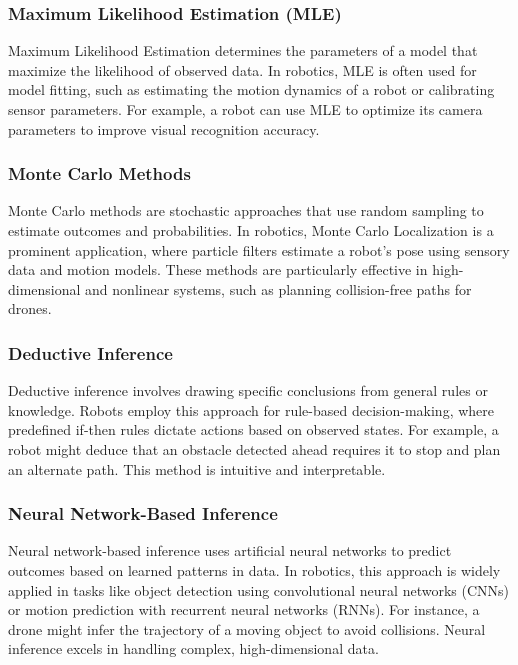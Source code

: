     \subsubsection{Maximum Likelihood Estimation (MLE)}
    Maximum Likelihood Estimation determines the parameters of a model that maximize the likelihood of observed data. In robotics, MLE is often used for model fitting, such as estimating the motion dynamics of a robot or calibrating sensor parameters. For example, a robot can use MLE to optimize its camera parameters to improve visual recognition accuracy. \cite{bishop-2006-pattern-recognition}
    
    \subsubsection{Monte Carlo Methods}
    Monte Carlo methods are stochastic approaches that use random sampling to estimate outcomes and probabilities. In robotics, Monte Carlo Localization is a prominent application, where particle filters estimate a robot’s pose using sensory data and motion models. These methods are particularly effective in high-dimensional and nonlinear systems, such as planning collision-free paths for drones. \cite{russell-2010-artificial-intelligence}
    
    \subsubsection{Deductive Inference}
    Deductive inference involves drawing specific conclusions from general rules or knowledge. Robots employ this approach for rule-based decision-making, where predefined if-then rules dictate actions based on observed states. For example, a robot might deduce that an obstacle detected ahead requires it to stop and plan an alternate path. This method is intuitive and interpretable. \cite{russell-2010-artificial-intelligence}
    
    \subsubsection{Neural Network-Based Inference}
    Neural network-based inference uses artificial neural networks to predict outcomes based on learned patterns in data. In robotics, this approach is widely applied in tasks like object detection using convolutional neural networks (CNNs) or motion prediction with recurrent neural networks (RNNs). For instance, a drone might infer the trajectory of a moving object to avoid collisions. Neural inference excels in handling complex, high-dimensional data. \cite{lecun-2015-deep-learning}
    
